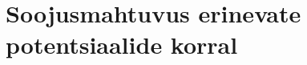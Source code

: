 \documentclass{trkut}%
\begin{document}

\chapter{Soojusmahtuvus erinevate potentsiaalide korral}

\end{document}
